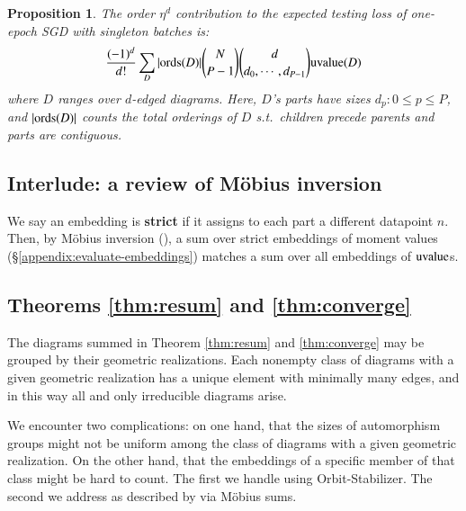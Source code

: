 \documentclass[final,12pt]{colt2021} %
\newtheorem{prop}{Proposition}
\newcommand{\uvalue}{\text{\textnormal{uvalue}}}
\newcommand{\ords}{\text{\textnormal{ords}}}
\begin{document}
        \begin{prop} \label{prop:vanilla}
            The order $\eta^d$ contribution to the expected testing loss of
            one-epoch SGD with singleton batches is:
            \begin{equation*}\label{eq:sgdbasiccoef}
                \frac{(-1)^d}{d!} \sum_{D} 
                |\ords(D)| {N \choose P-1} {d \choose d_0,\cdots,d_{P-1}}
                \uvalue(D)
            \end{equation*}
            where $D$ ranges over $d$-edged diagrams.  Here, $D$'s parts have
            sizes $d_p: 0\leq p\leq P$, and $|\ords(D)|$ counts the total
            orderings of $D$ s.t.\ children precede parents and parts are
            contiguous.
        \end{prop}

    \subsection{Interlude: a review of M\"obius inversion}          \label{appendix:mobius}

        We say an embedding is \textbf{strict} if it assigns to each part
        a different datapoint $n$.
        Then, by M\"obius inversion (\cite{ro64}), a sum over strict embeddings
        of moment values (\S\ref{appendix:evaluate-embeddings}) matches 
        a sum over all embeddings of $\uvalue$s.

    \subsection{Theorems \ref{thm:resum} and \ref{thm:converge}}    \label{appendix:resum}

        The diagrams summed in Theorem \ref{thm:resum} and \ref{thm:converge}
        may be grouped by their geometric realizations.  Each nonempty class of
        diagrams with a given geometric realization has a unique element with
        minimally many edges, and in this way all and only irreducible diagrams
        arise. 

        We encounter two complications: on one hand, that the sizes of
        automorphism groups might not be uniform among the class of diagrams
        with a given geometric realization.  On the other hand, that the
        embeddings of a specific member of that class might be hard to count.
        The first we handle using Orbit-Stabilizer.  The second we address as
        described by \label{subsubsect:mobius} via M\"obius sums.
           
\end{document}
